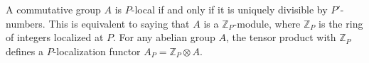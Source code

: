 A commutative group $A$ is $P$-local if and only if it is uniquely divisible by $P'$-numbers. This is equivalent to saying that $A$ is a $\mathbb{Z}_P$-module, where $\mathbb{Z}_P$ is the ring of integers localized at $P$. For any abelian group $A$, the tensor product with $\mathbb{Z}_P$ defines a $P$-localization functor $A_P = \mathbb{Z}_P \otimes A$.

